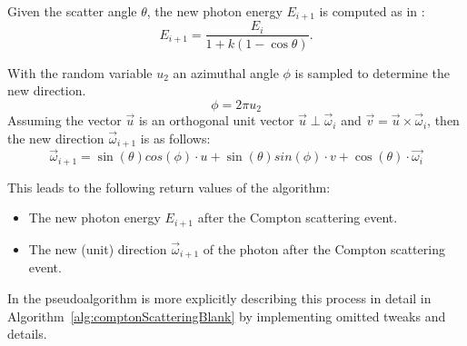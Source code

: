 Given the scatter angle $\theta$, the new photon energy $E_{i+1}$ is computed as in \cite{nelsoncompton}:
\begin{equation}
    E_{i+1} = \frac{E_i}{1 + k (1 - \cos \theta)}.
\end{equation}

With the random variable $u_2$ an azimuthal angle $\phi$ is sampled to determine the new direction.
\begin{equation}
    \phi = 2\pi u_2
\end{equation}
Assuming the vector $\vec{u}$ is an orthogonal unit vector $\vec{u} \perp \vec{\omega}_i$ and $\vec{v} = \vec{u} \times \vec{\omega}_i$, then the new direction $\vec{\omega}_{i+1}$ is as follows:
\begin{equation}
    \vec{\omega}_{i+1} = \sin(\theta)cos(\phi)\cdot u + \sin(\theta)sin(\phi)\cdot v + \cos(\theta)\cdot \vec{\omega_i}
\end{equation}

This leads to the following return values of the algorithm:
\begin{itemize}
    \item The new photon energy $E_{i+1}$ after the Compton scattering event.
    \item The new (unit) direction $\vec{\omega}_{i+1}$ of the photon after the
    Compton scattering event.
\end{itemize}

In the pseudoalgorithm is more explicitly describing this process in detail in
Algorithm~\ref{alg:comptonScatteringBlank} by implementing omitted tweaks and
details.

